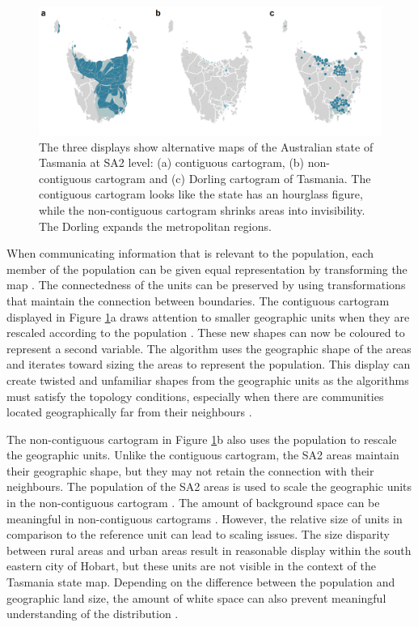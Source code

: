 \begin{Schunk}
\begin{figure}
\includegraphics[width=1\linewidth]{kobakian-cook_files/figure-latex/tasdisplays-1} \caption[The three displays show alternative maps of the Australian state of Tasmania at SA2 level]{The three displays show alternative maps of the Australian state of Tasmania at SA2 level: (a) contiguous cartogram, (b) non-contiguous cartogram and (c) Dorling cartogram of Tasmania. The contiguous cartogram looks like the state has an hourglass figure, while the non-contiguous cartogram shrinks areas into invisibility. The Dorling expands the metropolitan regions.}\label{fig:tasdisplays}
\end{figure}
\end{Schunk}

When communicating information that is relevant to the population, each
member of the population can be given equal representation by
transforming the map \citep{TVSSS}. The connectedness of the units can
be preserved by using transformations that maintain the connection
between boundaries. The contiguous cartogram displayed in Figure
\ref{fig:tasdisplays}a draws attention to smaller geographic units when
they are rescaled according to the population \citep{DMAHP}. These new
shapes can now be coloured to represent a second variable. The algorithm
uses the geographic shape of the areas and iterates toward sizing the
areas to represent the population. This display can create twisted and
unfamiliar shapes from the geographic units as the algorithms must
satisfy the topology conditions, especially when there are communities
located geographically far from their neighbours \citep{TVSSS}.

The non-contiguous cartogram in Figure \ref{fig:tasdisplays}b also uses
the population to rescale the geographic units. Unlike the contiguous
cartogram, the SA2 areas maintain their geographic shape, but they may
not retain the connection with their neighbours. The population of the
SA2 areas is used to scale the geographic units in the non-contiguous
cartogram \citep{NAC}. The amount of background space can be meaningful
in non-contiguous cartograms \citep{ECGC}. However, the relative size of
units in comparison to the reference unit can lead to scaling issues.
The size disparity between rural areas and urban areas result in
reasonable display within the south eastern city of Hobart, but these
units are not visible in the context of the Tasmania state map.
Depending on the difference between the population and geographic land
size, the amount of white space can also prevent meaningful
understanding of the distribution \citep{TVSSS}.

